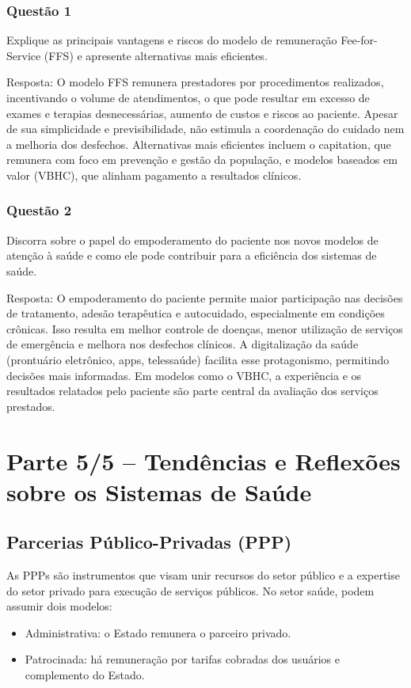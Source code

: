 \documentclass[a4paper,12pt]{article}
\begin{document}
\subsubsection{Questão 1}
\label{sec:org01c5b55}
Explique as principais vantagens e riscos do modelo de remuneração Fee-for-Service (FFS) e apresente alternativas mais eficientes.

Resposta:
O modelo FFS remunera prestadores por procedimentos realizados, incentivando o volume de atendimentos, o que pode resultar em excesso de exames e terapias desnecessárias, aumento de custos e riscos ao paciente. Apesar de sua simplicidade e previsibilidade, não estimula a coordenação do cuidado nem a melhoria dos desfechos. Alternativas mais eficientes incluem o capitation, que remunera com foco em prevenção e gestão da população, e modelos baseados em valor (VBHC), que alinham pagamento a resultados clínicos.
\subsubsection{Questão 2}
\label{sec:orge67f627}
Discorra sobre o papel do empoderamento do paciente nos novos modelos de atenção à saúde e como ele pode contribuir para a eficiência dos sistemas de saúde.

Resposta:
O empoderamento do paciente permite maior participação nas decisões de tratamento, adesão terapêutica e autocuidado, especialmente em condições crônicas. Isso resulta em melhor controle de doenças, menor utilização de serviços de emergência e melhora nos desfechos clínicos. A digitalização da saúde (prontuário eletrônico, apps, telessaúde) facilita esse protagonismo, permitindo decisões mais informadas. Em modelos como o VBHC, a experiência e os resultados relatados pelo paciente são parte central da avaliação dos serviços prestados.
\section{Parte 5/5 – Tendências e Reflexões sobre os Sistemas de Saúde}
\label{sec:orged8e2ad}

\subsection{Parcerias Público-Privadas (PPP)}
\label{sec:orgf0076cf}
As PPPs são instrumentos que visam unir recursos do setor público e a expertise do setor privado para execução de serviços públicos. No setor saúde, podem assumir dois modelos:
\begin{itemize}
\item Administrativa: o Estado remunera o parceiro privado.
\item Patrocinada: há remuneração por tarifas cobradas dos usuários e complemento do Estado.
\end{itemize}
\end{document}
